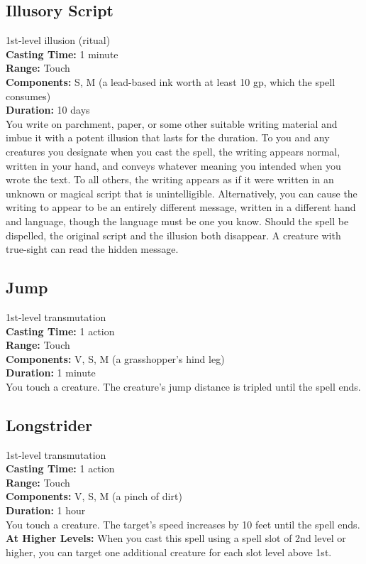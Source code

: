\documentclass[11pt, A4paper, english]{article}
\begin{document}
		\subsection{Illusory Script}
1st-level illusion (ritual) \\
\textbf{Casting Time:} 1 minute \\
\textbf{Range:} Touch \\
\textbf{Components:} S, M (a lead-based ink worth at least 10 gp, which the spell consumes) \\
\textbf{Duration:} 10 days \\
You write on parchment, paper, or some other suitable writing material and imbue it with a potent illusion that lasts for the duration. To you and any creatures you designate when you cast the spell, the writing appears normal, written in your hand, and conveys whatever meaning you intended when you wrote the text. To all others, the writing appears as if it were written in an unknown or magical script that is unintelligible. Alternatively, you can cause the writing to appear to be an entirely different message, written in a different hand and language, though the language must be one you know. Should the spell be dispelled, the original script and the illusion both disappear. A creature with true-sight can read the hidden message.

		\subsection{Jump}
1st-level transmutation \\
\textbf{Casting Time:} 1 action \\
\textbf{Range:} Touch \\
\textbf{Components:} V, S, M (a grasshopper’s hind leg) \\
\textbf{Duration:} 1 minute \\
You touch a creature. The creature’s jump distance is tripled until the spell ends.

		\subsection{Longstrider}
1st-level transmutation \\
\textbf{Casting Time:} 1 action \\
\textbf{Range:} Touch \\
\textbf{Components:} V, S, M (a pinch of dirt) \\
\textbf{Duration:} 1 hour \\
You touch a creature. The target’s speed increases by 10 feet until the spell ends. \\
\textbf{At Higher Levels:} When you cast this spell using a spell slot of 2nd level or higher, you can target one additional creature for each slot level above 1st.
\end{document}
